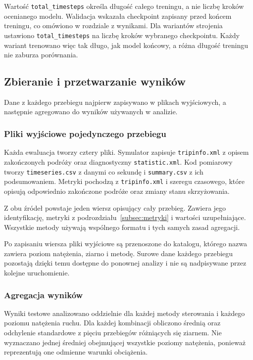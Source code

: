 Wartość \texttt{total\_timesteps} określa długość całego treningu, a nie liczbę kroków ocenianego modelu. Walidacja wskazała checkpoint zapisany przed końcem treningu, co omówiono w rozdziale z wynikami. Dla wariantów strojenia ustawiono \texttt{total\_timesteps} na liczbę kroków wybranego checkpointu. Każdy wariant trenowano więc tak długo, jak model końcowy, a różna długość treningu nie zaburza porównania.

\subsection{Zbieranie i przetwarzanie wyników}
\label{subsec:przetwarzanie-wynikow}

Dane z każdego przebiegu najpierw zapisywano w plikach wyjściowych, a następnie agregowano do wyników używanych w analizie.

\subsubsection{Pliki wyjściowe pojedynczego przebiegu}
\label{subsubsec:pliki-przebiegu}

{\setlength{\emergencystretch}{1em}
Każda ewaluacja tworzy cztery pliki. Symulator zapisuje \texttt{tripinfo.xml} z opisem zakończonych podróży oraz diagnostyczny \texttt{statistic.xml}. Kod pomiarowy tworzy \texttt{timeseries.csv} z danymi co sekundę i \texttt{summary.csv} z ich podsumowaniem. Metryki pochodzą z \texttt{tripinfo.xml} i szeregu czasowego, które opisują odpowiednio zakończone podróże oraz zmiany stanu skrzyżowania.\par}

Z obu źródeł powstaje jeden wiersz opisujący cały przebieg. Zawiera jego identyfikację, metryki z podrozdziału~\ref{subsec:metryki} i wartości uzupełniające. Wszystkie metody używają wspólnego formatu i tych samych zasad agregacji.

Po zapisaniu wiersza pliki wyjściowe są przenoszone do katalogu, którego nazwa zawiera poziom natężenia, ziarno i metodę. Surowe dane każdego przebiegu pozostają dzięki temu dostępne do ponownej analizy i nie są nadpisywane przez kolejne uruchomienie.

\subsubsection{Agregacja wyników}
\label{subsubsec:agregacja}

Wyniki testowe analizowano oddzielnie dla każdej metody sterowania i każdego poziomu natężenia ruchu. Dla każdej kombinacji obliczono średnią oraz odchylenie standardowe z pięciu przebiegów różniących się ziarnem. Nie wyznaczano jednej średniej obejmującej wszystkie poziomy natężenia, ponieważ reprezentują one odmienne warunki obciążenia.

